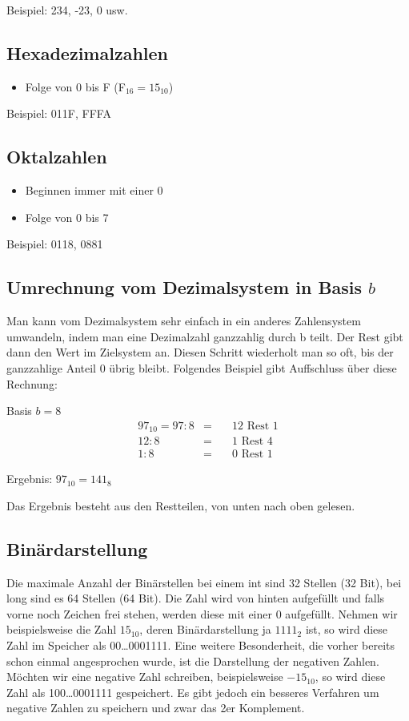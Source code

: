 Beispiel: 234, -23, 0 usw.

\subsection{Hexadezimalzahlen}

\begin{itemize}
\item Folge von 0 bis F (F$_{16} = 15_{10}$)
\end{itemize}

Beispiel: 011F, FFFA

\subsection{Oktalzahlen}

\begin{itemize}
\item Beginnen immer mit einer 0
\item Folge von 0 bis 7
\end{itemize}

Beispiel: 0118, 0881

\subsection{Umrechnung vom Dezimalsystem in Basis $b$}

Man kann vom Dezimalsystem sehr einfach in ein anderes Zahlensystem umwandeln, indem man eine Dezimalzahl ganzzahlig durch b teilt. Der Rest gibt dann den Wert im Zielsystem an. Diesen Schritt wiederholt man so oft, bis der ganzzahlige Anteil 0 übrig bleibt. Folgendes Beispiel gibt Auffschluss über diese Rechnung:

Basis $b = 8$
\begin{eqnarray}
97_{10} = 97 : 8 & = & \quad\text{12 Rest 1}\\
12 : 8 & = & \quad\text{1 Rest 4}\\
1 : 8 & = & \quad\text{0 Rest 1}
\end{eqnarray}

Ergebnis: $97_{10} = 141_{8}$

Das Ergebnis besteht aus den Restteilen, von unten nach oben gelesen. 

\subsection{Binärdarstellung}

Die maximale Anzahl der Binärstellen bei einem int sind 32 Stellen (32 Bit), bei long sind es 64 Stellen (64 Bit). Die Zahl wird von hinten aufgefüllt und falls vorne noch Zeichen frei stehen, werden diese mit einer 0 aufgefüllt. Nehmen wir beispielsweise die Zahl $15_{10}$, deren Binärdarstellung ja $1111_{2}$ ist, so wird diese Zahl im Speicher als 00\dots0001111. Eine weitere Besonderheit, die vorher bereits schon einmal angesprochen wurde, ist die Darstellung der negativen Zahlen. Möchten wir eine negative Zahl schreiben, beispielsweise $-15_{10}$, so wird diese Zahl als 100\dots0001111 gespeichert. Es gibt jedoch ein besseres Verfahren um negative Zahlen zu speichern und zwar das 2er Komplement.

